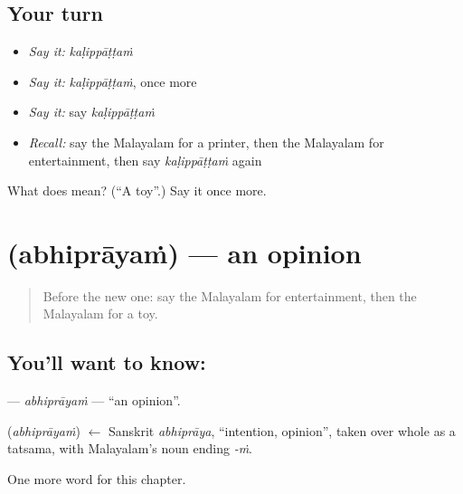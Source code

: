 \subsection*{Your turn}
\begin{itemize}
\raggedright
  \item \emph{Say it:} \emph{kaḷippāṭṭaṁ}
  \item \emph{Say it:} \emph{kaḷippāṭṭaṁ}, once more
  \item \emph{Say it:} say \emph{kaḷippāṭṭaṁ}
  \item \emph{Recall:} say the Malayalam for a printer, then the Malayalam for entertainment, then say \emph{kaḷippāṭṭaṁ} again
\end{itemize}

\begin{tcolorbox}[breakable,colback=teal!4,colframe=teal!35!black,title={Before you move on}]
What does  mean? (\textquotedblleft{}A toy\textquotedblright{}.) Say it once more.
\end{tcolorbox}
\section[\texorpdfstring{\ml{അഭിപ്രായം} (abhiprāyaṁ)}{അഭിപ്രായം (abhiprāyaṁ)}]{ (abhiprāyaṁ) — an opinion}

\label{lesson:ML-C256-abhiprayam}



\begin{quote}
Before the new one: say the Malayalam for entertainment, then the Malayalam for a toy.
\end{quote}

\subsection*{You'll want to know: }
\textbf{} — \emph{abhiprāyaṁ} — \textquotedblleft{}an opinion\textquotedblright{}.

\begin{cousinweb}
\textbf{} (\emph{abhiprāyaṁ}) $\leftarrow$ Sanskrit \emph{abhiprāya}, \textquotedblleft{}intention, opinion\textquotedblright{}, taken over whole as a tatsama, with Malayalam's noun ending \emph{-ṁ}.
\end{cousinweb}

\begin{grammarlens}[title={What you've built}]
One more word for this chapter.
\end{grammarlens}

